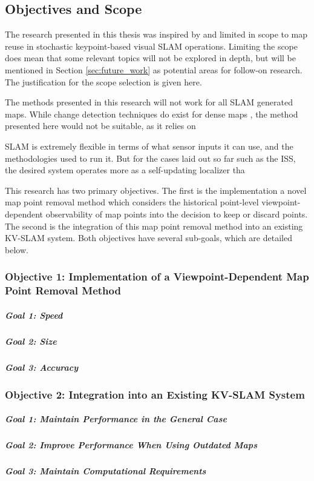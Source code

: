 \subsection{Objectives and Scope}
\label{objectives}

The research presented in this thesis was inspired by and limited in scope to map reuse in stochastic keypoint-based visual SLAM operations. Limiting the scope does mean that some relevant topics will not be explored in depth, but will be mentioned in Section \ref{sec:future_work} as potential areas for follow-on research. The justification for the scope selection is given here.

The methods presented in this research will not work for all SLAM generated maps. While change detection techniques do exist for dense maps \cite{PLACEHOLDERa}, the method presented here would not be suitable, as it relies on 

SLAM is extremely flexible in terms of what sensor inputs it can use, and the methodologies used to run it. But for the cases laid out so far such as the ISS, the desired system operates more as a self-updating localizer tha

This research has two primary objectives. The first is the implementation a novel map point removal method which considers the historical point-level viewpoint-dependent observability of map points into the decision to keep or discard points. The second is the integration of this map point removal method into an existing KV-SLAM system. Both objectives have several sub-goals, which are detailed below.

\subsubsection*{Objective 1: Implementation of a Viewpoint-Dependent Map Point Removal Method}

\subparagraph{Goal 1: Speed}
\subparagraph{Goal 2: Size}
\subparagraph{Goal 3: Accuracy}

\subsubsection*{Objective 2: Integration into an Existing KV-SLAM System}

\subparagraph{Goal 1: Maintain Performance in the General Case}
\subparagraph{Goal 2: Improve Performance When Using Outdated Maps}
\subparagraph{Goal 3: Maintain Computational Requirements}



